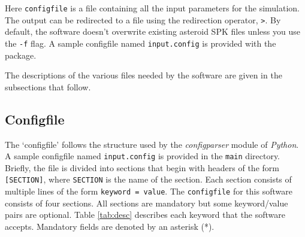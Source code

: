 \documentclass[10pt,a4paper]{article}
\begin{document}
Here \verb+configfile+ is a file containing all the input parameters
for the simulation. The output can be redirected to a file using the
redirection operator, \verb+>+. By default, the software doesn't
overwrite existing asteroid SPK files unless you use the \verb+-f+
flag. A sample configfile named \verb+input.config+ is provided with
the package.

The descriptions of the various files needed by the software are given
in the subsections that follow.

\subsection{Configfile}

The `configfile' follows the structure used by the \emph{configparser}
module of \emph{Python}. A sample configfile named \verb+input.config+
is provided in the \verb+main+ directory. Briefly, the file is divided
into sections that begin with headers of the form \verb+[SECTION]+,
where \verb+SECTION+ is the name of the section. Each section consists
of multiple lines of the form \verb+keyword = value+.  The
\verb+configfile+ for this software consists of four sections. All
sections are mandatory but some keyword/value pairs are optional.
Table \ref{tab:desc} describes each keyword that the software
accepts. Mandatory fields are denoted by an asterisk (*).
\end{document}
